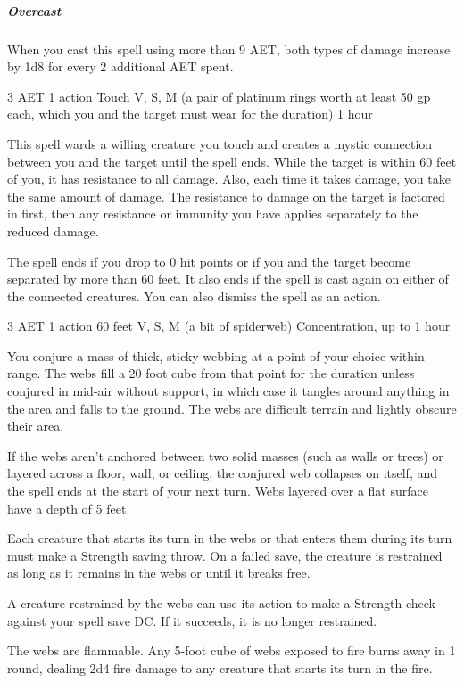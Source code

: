 \subparagraph*{Overcast} When you cast this spell using more than 9 AET, both types of damage increase by 1d8 for every 2 additional AET spent.


{3 AET}
{1 action}
{Touch}
{V, S, M (a pair of platinum rings worth at least 50 gp each, which you and the target must wear for the duration)}
{1 hour}

This spell wards a willing creature you touch and creates a mystic connection between you and the target until the spell ends. While the target is within 60 feet of you, it has resistance to all damage. Also, each time it takes damage, you take the same amount of damage. The resistance to damage on the target is factored in first, then any resistance or immunity you have applies separately to the reduced damage.

The spell ends if you drop to 0 hit points or if you and the target become separated by more than 60 feet. It also ends if the spell is cast again on either of the connected creatures. You can also dismiss the spell as an action.


{3 AET}
{1 action}
{60 feet}
{V, S, M (a bit of spiderweb)}
{Concentration, up to 1 hour}

You conjure a mass of thick, sticky webbing at a point of your choice within range. The webs fill a 20 foot cube from that point for the duration unless conjured in mid-air without support, in which case it tangles around anything in the area and falls to the ground. The webs are difficult terrain and lightly obscure their area.

If the webs aren't anchored between two solid masses (such as walls or trees) or layered across a floor, wall, or ceiling, the conjured web collapses on itself, and the spell ends at the start of your next turn. Webs layered over a flat surface have a depth of 5 feet.

Each creature that starts its turn in the webs or that enters them during its turn must make a Strength saving throw. On a failed save, the creature is restrained as long as it remains in the webs or until it breaks free.

A creature restrained by the webs can use its action to make a Strength check against your spell save DC. If it succeeds, it is no longer restrained.

The webs are flammable. Any 5-foot cube of webs exposed to fire burns away in 1 round, dealing 2d4 fire damage to any creature that starts its turn in the fire.


